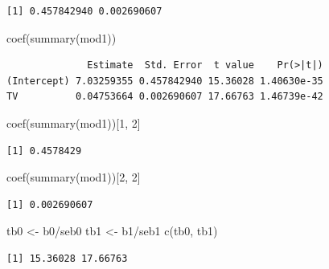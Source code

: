 \documentclass[
]{article}
\newenvironment{Shaded}{\begin{snugshade}}{\end{snugshade}}
\newcommand{\DecValTok}[1]{\textcolor[rgb]{0.00,0.00,0.81}{#1}}
\newcommand{\FunctionTok}[1]{\textcolor[rgb]{0.00,0.00,0.00}{#1}}
\newcommand{\NormalTok}[1]{#1}
\newcommand{\OtherTok}[1]{\textcolor[rgb]{0.56,0.35,0.01}{#1}}
\newcommand{\SpecialCharTok}[1]{\textcolor[rgb]{0.00,0.00,0.00}{#1}}
\begin{document}
\begin{verbatim}
[1] 0.457842940 0.002690607
\end{verbatim}

\begin{Shaded}
\begin{Highlighting}[]
\FunctionTok{coef}\NormalTok{(}\FunctionTok{summary}\NormalTok{(mod1))}
\end{Highlighting}
\end{Shaded}

\begin{verbatim}
              Estimate  Std. Error  t value    Pr(>|t|)
(Intercept) 7.03259355 0.457842940 15.36028 1.40630e-35
TV          0.04753664 0.002690607 17.66763 1.46739e-42
\end{verbatim}

\begin{Shaded}
\begin{Highlighting}[]
\FunctionTok{coef}\NormalTok{(}\FunctionTok{summary}\NormalTok{(mod1))[}\DecValTok{1}\NormalTok{, }\DecValTok{2}\NormalTok{]}
\end{Highlighting}
\end{Shaded}

\begin{verbatim}
[1] 0.4578429
\end{verbatim}

\begin{Shaded}
\begin{Highlighting}[]
\FunctionTok{coef}\NormalTok{(}\FunctionTok{summary}\NormalTok{(mod1))[}\DecValTok{2}\NormalTok{, }\DecValTok{2}\NormalTok{]}
\end{Highlighting}
\end{Shaded}

\begin{verbatim}
[1] 0.002690607
\end{verbatim}

\begin{Shaded}
\begin{Highlighting}[]
\NormalTok{tb0 }\OtherTok{\textless{}{-}}\NormalTok{ b0}\SpecialCharTok{/}\NormalTok{seb0}
\NormalTok{tb1 }\OtherTok{\textless{}{-}}\NormalTok{ b1}\SpecialCharTok{/}\NormalTok{seb1}
\FunctionTok{c}\NormalTok{(tb0, tb1)}
\end{Highlighting}
\end{Shaded}

\begin{verbatim}
[1] 15.36028 17.66763
\end{verbatim}
\end{document}
